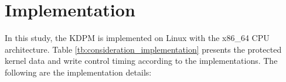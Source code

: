 \section{Implementation}\label{subsection:implementation}
%

In this study, the KDPM is implemented on Linux with the x86\_64 CPU
architecture. 
%
Table \ref{tb:consideration_implementation} presents the protected kernel data
and write control timing according to the implementations. 
The following are the implementation details:


\begin{table}[t]
  \centering
 \caption{
   Comparison of the implementations of the KDPM
   }
 \label{tb:consideration_implementation}
 \end{table}


